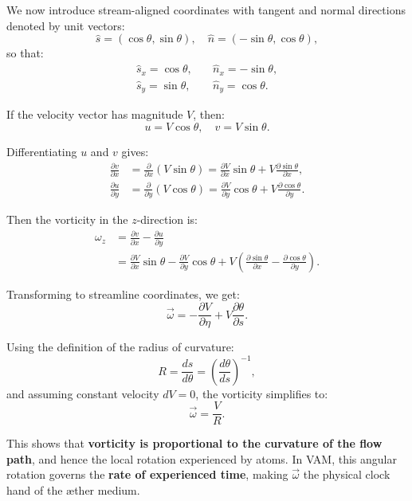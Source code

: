 \documentclass[12pt]{article}
\begin{document}
    We now introduce stream-aligned coordinates with tangent and normal directions denoted by unit vectors:
    \[
        \hat{s} = (\cos \theta, \sin \theta), \quad
        \hat{n} = (-\sin \theta, \cos \theta),
    \]
    so that:
    \begin{align}
        \hat{s}_x = \cos \theta, &\quad \hat{n}_x = -\sin \theta, \\
        \hat{s}_y = \sin \theta, &\quad \hat{n}_y = \cos \theta.
    \end{align}

    If the velocity vector has magnitude \(V\), then:
    \begin{equation}
        u = V \cos \theta, \quad
        v = V \sin \theta.
    \end{equation}

    Differentiating \(u\) and \(v\) gives:
    \begin{align}
        \frac{\partial v}{\partial x} &= \frac{\partial}{\partial x} (V \sin \theta) = \frac{\partial V}{\partial x} \sin \theta + V \frac{\partial \sin \theta}{\partial x}, \\
        \frac{\partial u}{\partial y} &= \frac{\partial}{\partial y} (V \cos \theta) = \frac{\partial V}{\partial y} \cos \theta + V \frac{\partial \cos \theta}{\partial y}.
    \end{align}

    Then the vorticity in the \(z\)-direction is:
    \begin{align}
        \omega_z &= \frac{\partial v}{\partial x} - \frac{\partial u}{\partial y} \\
        &= \frac{\partial V}{\partial x} \sin \theta - \frac{\partial V}{\partial y} \cos \theta
        + V \left( \frac{\partial \sin \theta}{\partial x} - \frac{\partial \cos \theta}{\partial y} \right).
    \end{align}

    Transforming to streamline coordinates, we get:
    \begin{equation}
        \vec{\omega} = -\frac{\partial V}{\partial \eta} + V \frac{\partial \theta}{\partial s}.
    \end{equation}

    Using the definition of the radius of curvature:
    \begin{equation}
        R = \frac{ds}{d\theta} = \left( \frac{d\theta}{ds} \right)^{-1},
    \end{equation}
    and assuming constant velocity \(dV = 0\), the vorticity simplifies to:
    \begin{equation}
        \boxed{\vec{\omega} = \frac{V}{R}}.
    \end{equation}

    This shows that \textbf{vorticity is proportional to the curvature of the flow path}, and hence the local rotation experienced by atoms. In VAM, this angular rotation governs the \textbf{rate of experienced time}, making \(\vec{\omega}\) the physical clock hand of the æther medium.


\ifdefined\standalonechapter
\else


\end{document}
